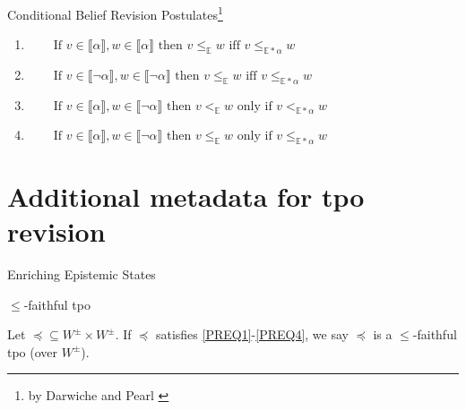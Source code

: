 \documentclass[11pt]{beamer}
\newcommand{\modelsOf}[1]{\llbracket #1 \rrbracket}
\begin{document}
\begin{frame}{Conditional Belief Revision Postulates\footnote{by Darwiche and Pearl \cite{Darwiche1997}}}
    \begin{enumerate}[wide=0pt, widest=99,leftmargin=\parindent,label = (CR$\arabic*$)]
        \item\label{CR1} $\qquad \textrm{If } v\in \modelsOf{\alpha}, w \in \modelsOf{\alpha} \textrm{ then } v \leq_{\mathbb{E}} w \textrm{ iff } v \leq_{\mathbb{E\ast\alpha}} w$
        \item\label{CR2} $\qquad \textrm{If } v\in \modelsOf{\neg\alpha}, w \in \modelsOf{\neg\alpha} \textrm{ then } v \leq_{\mathbb{E}} w \textrm{ iff } v \leq_{\mathbb{E\ast\alpha}} w$
        \item\label{CR3} $\qquad \textrm{If } v\in \modelsOf{\alpha}, w \in \modelsOf{\neg\alpha} \textrm{ then } v <_{\mathbb{E}} w \textrm{ only if } v <_{\mathbb{E\ast\alpha}} w$
        \item\label{CR4} $\qquad \textrm{If } v\in \modelsOf{\alpha}, w \in \modelsOf{\neg\alpha} \textrm{ then } v \leq_{\mathbb{E}} w \textrm{ only if } v \leq_{\mathbb{E\ast\alpha}} w$
    \end{enumerate}
    \note{
        \begin{itemize}
            \item 
        \end{itemize}
    }
\end{frame}

\section{Additional metadata for tpo revision}

\begin{frame}{Enriching Epistemic States}
\end{frame}

\begin{frame}{$\leq$-faithful tpo}
    \begin{definition}
        \label{definition:faithful-tpo}Let $\preceq \subseteq W^{\pm} \times W^{\pm}$. If $\preceq$ satisfies \ref{PREQ1}-\ref{PREQ4}, we say $\preceq$ is a $\leq$-faithful tpo (over $W^{\pm}$).
    \end{definition}
\end{frame}
\end{document}
